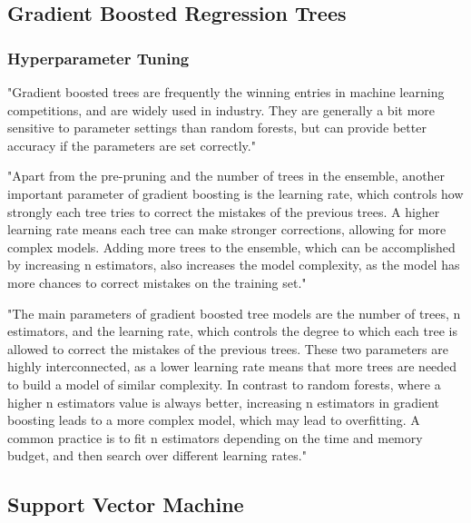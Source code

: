 \subsection{Gradient Boosted Regression Trees}\label{subsec:gradient-boosted-regression-trees}

\subsubsection*{Hyperparameter Tuning}

"Gradient boosted trees are frequently the winning entries in machine
learning competitions, and are widely used in industry. They are
generally a bit more sensitive to parameter settings than random
forests, but can provide better accuracy if the parameters are set
correctly." \cite[p. 88-89]{muller_introductionmachinelearning_2016}

"Apart from the pre-pruning and the number of trees in the ensemble,
another important parameter of gradient boosting is the learning rate,
which controls how strongly each tree tries to correct the mistakes of
the previous trees. A higher learning rate means each tree can make
stronger corrections, allowing for more complex models. Adding more trees to the ensemble, which
can be accomplished
by increasing
n estimators, also increases the model complexity, as the model has
more chances to correct mistakes on the training set." \cite[p.
88-89]{muller_introductionmachinelearning_2016}

"The main parameters of gradient boosted tree models are the number
of trees, n estimators, and the learning rate, which controls the degree to which each tree is
allowed to correct the
mistakes of the previous trees.
These two parameters are highly interconnected, as a lower
learning rate means that more trees are needed to build a model of
similar complexity. In contrast to random forests, where a higher
n estimators value is always better, increasing n estimators in gradient
boosting leads to a more complex model, which may lead to overfitting. A
common practice is to fit n estimators depending on the time and
memory budget, and then search over different learning rates." \cite[p.
88-89]{muller_introductionmachinelearning_2016}

\subsection{Support Vector Machine}\label{subsec:support-vector-machine}


